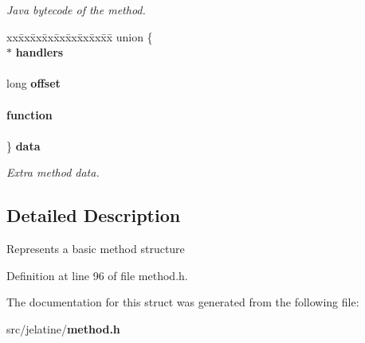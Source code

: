 \begin{DoxyCompactItemize}
\begin{DoxyCompactList}\small\item\em Java bytecode of the method. \item\end{DoxyCompactList}\item 
\begin{tabbing}
xx\=xx\=xx\=xx\=xx\=xx\=xx\=xx\=xx\=\kill
union \{\\
 $\ast$ {\bf handlers}\\
\>\\
\>long {\bf offset}\\
\>\\
 {\bf function}\\
\>\\
\} {\bf data}\label{structmethod__t_adda3efa77283fb738c57bb915a2a1f9f}
\\

\end{tabbing}\begin{DoxyCompactList}\small\item\em Extra method data. \item\end{DoxyCompactList}\end{DoxyCompactItemize}


\subsection{Detailed Description}
Represents a basic method structure 

Definition at line 96 of file method.h.



The documentation for this struct was generated from the following file:\begin{DoxyCompactItemize}
\item 
src/jelatine/{\bf method.h}\end{DoxyCompactItemize}
